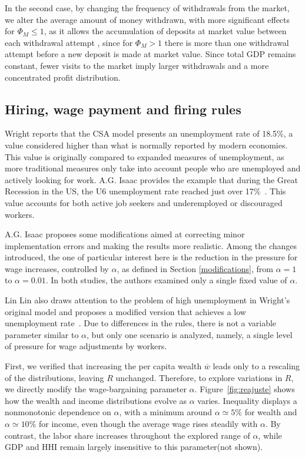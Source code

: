 \documentclass[12pt,preprint]{revtex4-1}
\newcommand{\R}{\color{red}}
\begin{document}
In the second case, by changing the frequency of withdrawals from the market, we alter the average amount of money withdrawn, with more significant effects for $\Phi_M \le 1$, as it allows the accumulation of deposits at market value between each withdrawal attempt , since for $\Phi_M>1$ there is more than one withdrawal attempt before a new deposit is made at market value. Since total GDP remains constant, fewer visits to the market imply larger withdrawals and a more concentrated profit distribution. 


\subsection{Hiring, wage payment and firing rules} 
\label{sec:hiring}


Wright reports that the CSA model presents an unemployment rate of 18.5\%, a value considered higher than what is normally reported by modern economies. This value is originally compared to expanded measures of unemployment, as more traditional measures only take into account people who are unemployed and actively looking for work. A.G. Isaac provides the example that during the Great Recession in the US, the U6 unemployment rate reached just over 17\%~\cite{ISAAC2019}.  
This value accounts for both active job seekers and underemployed or discouraged workers. 
%

A.G. Isaac proposes some modifications aimed at correcting minor implementation errors and making the results more realistic. {\R Among the changes introduced, the one of particular interest here is the reduction in the pressure for wage increases, controlled by $\alpha$, as defined in Section \ref{modifications}, from $\alpha=1$ to $\alpha=0.01$. In both studies, the authors examined only a single fixed value of $\alpha$.
}

Lin Lin also draws attention to the problem of high unemployment in Wright's original model and proposes a modified version that achieves a low unemployment rate~\cite{lin-lux}. Due to differences in the rules, there is not a variable parameter similar to  $\alpha$, but only one scenario is analyzed,  namely, a single level of pressure for wage adjustments by workers. 


First, we verified that increasing the per capita wealth  $\overline{w}$ leads only to a rescaling of the distributions, leaving $R$ unchanged. Therefore, to explore variations in $R$, we directly modify the wage-bargaining parameter $\alpha$.  Figure~\ref{fig:reajuste} shows how the wealth and income distributions evolve as $\alpha$ varies. 
Inequality displays a nonmonotonic dependence on $\alpha$, with a minimum around $\alpha\simeq5\%$ for wealth and $\alpha\simeq 10\%$ for income, even though the average wage rises steadily with $\alpha$.  
By contrast, the labor share increases throughout the explored range of $\alpha$, 
while GDP and HHI remain largely insensitive to this parameter(not shown). 
\end{document}
